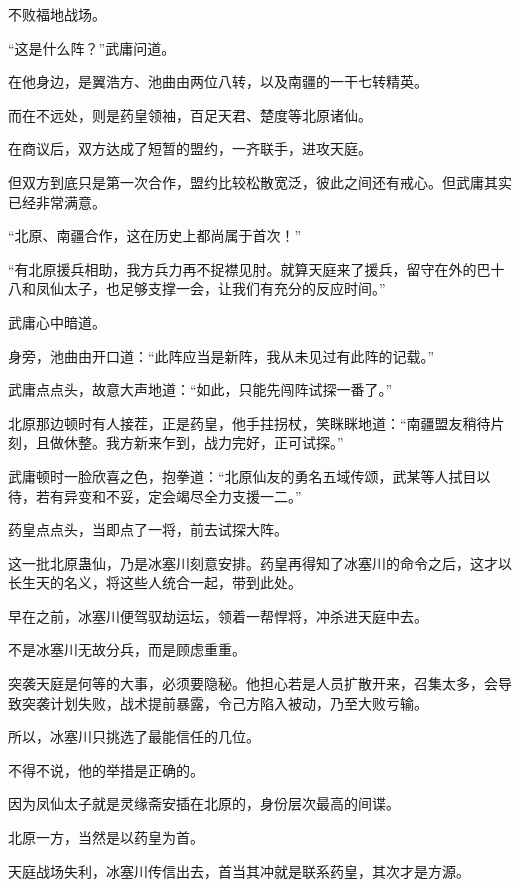 
\begin{this_body}

不败福地战场。

“这是什么阵？”武庸问道。

在他身边，是翼浩方、池曲由两位八转，以及南疆的一干七转精英。

而在不远处，则是药皇领袖，百足天君、楚度等北原诸仙。

在商议后，双方达成了短暂的盟约，一齐联手，进攻天庭。

但双方到底只是第一次合作，盟约比较松散宽泛，彼此之间还有戒心。但武庸其实已经非常满意。

“北原、南疆合作，这在历史上都尚属于首次！”

“有北原援兵相助，我方兵力再不捉襟见肘。就算天庭来了援兵，留守在外的巴十八和凤仙太子，也足够支撑一会，让我们有充分的反应时间。”

武庸心中暗道。

身旁，池曲由开口道：“此阵应当是新阵，我从未见过有此阵的记载。”

武庸点点头，故意大声地道：“如此，只能先闯阵试探一番了。”

北原那边顿时有人接茬，正是药皇，他手拄拐杖，笑眯眯地道：“南疆盟友稍待片刻，且做休整。我方新来乍到，战力完好，正可试探。”

武庸顿时一脸欣喜之色，抱拳道：“北原仙友的勇名五域传颂，武某等人拭目以待，若有异变和不妥，定会竭尽全力支援一二。”

药皇点点头，当即点了一将，前去试探大阵。

这一批北原蛊仙，乃是冰塞川刻意安排。药皇再得知了冰塞川的命令之后，这才以长生天的名义，将这些人统合一起，带到此处。

早在之前，冰塞川便驾驭劫运坛，领着一帮悍将，冲杀进天庭中去。

不是冰塞川无故分兵，而是顾虑重重。

突袭天庭是何等的大事，必须要隐秘。他担心若是人员扩散开来，召集太多，会导致突袭计划失败，战术提前暴露，令己方陷入被动，乃至大败亏输。

所以，冰塞川只挑选了最能信任的几位。

不得不说，他的举措是正确的。

因为凤仙太子就是灵缘斋安插在北原的，身份层次最高的间谍。

北原一方，当然是以药皇为首。

天庭战场失利，冰塞川传信出去，首当其冲就是联系药皇，其次才是方源。


\end{this_body}
